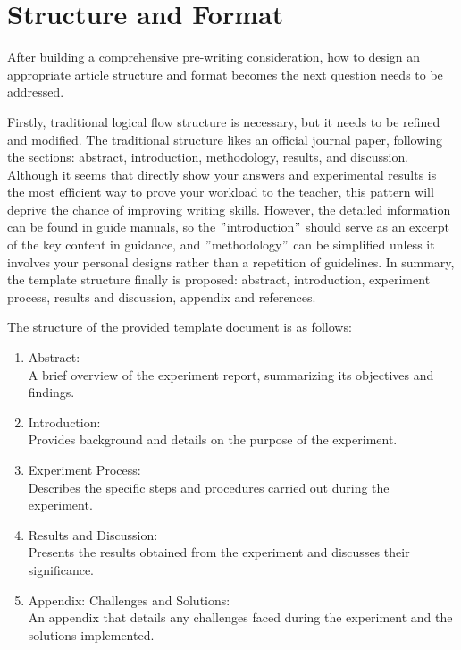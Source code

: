 \documentclass[12pt]{article}
\begin{document}
\section{Structure and Format}

After building a comprehensive pre-writing consideration, how to design an appropriate article structure and format becomes the next question needs to be addressed.

Firstly, traditional logical flow structure is necessary, but it needs to be refined and modified.
The traditional structure likes an official journal paper, following the sections: abstract, introduction, methodology, results, and discussion.
Although it seems that directly show your answers and experimental results is the most efficient way to prove your workload to the teacher, this pattern will deprive the chance of improving writing skills.
However, the detailed information can be found in guide manuals, so the \("\)introduction\("\) should serve as an excerpt of the key content in guidance, and \("\)methodology\("\) can be simplified unless it involves your personal designs rather than a repetition of guidelines.
In summary, the template structure finally is proposed: abstract, introduction, experiment process, results and discussion, appendix and references.


The structure of the provided template document is as follows:

\begin{enumerate}
    \item Abstract: \\A brief overview of the experiment report, summarizing its objectives and findings.
    \item Introduction: \\Provides background and details on the purpose of the experiment.
    \item Experiment Process: \\Describes the specific steps and procedures carried out during the experiment.
    \item Results and Discussion: \\Presents the results obtained from the experiment and discusses their significance.
    \item Appendix: Challenges and Solutions: \\An appendix that details any challenges faced during the experiment and the solutions implemented.
\end{enumerate}
\end{document}
